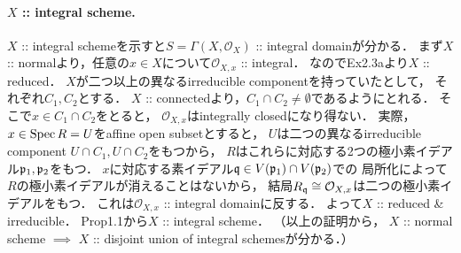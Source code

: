 \documentclass[a4paper]{jsarticle}
\newcommand{\shO}{\mathcal{O}}
\begin{document}
    \paragraph{$X$ :: integral scheme.}
    $X$ :: integral schemeを示すと$S=\Gamma(X,\shO_X)$ :: integral domainが分かる．
    まず$X$ :: normalより，任意の$x \in X$について$\shO_{X,x}$ :: integral．
    なのでEx2.3aより$X$ :: reduced．
    $X$が二つ以上の異なるirreducible componentを持っていたとして，
    それぞれ$C_1, C_2$とする．
    $X$ :: connectedより，$C_1 \cap C_2 \neq \emptyset$であるようにとれる．
    そこで$x \in C_1 \cap C_2$をとると，
    $\shO_{X,x}$はintegrally closedになり得ない．
    実際，
    $x \in \operatorname{Spec} R=U$をaffine open subsetとすると，
    $U$は二つの異なるirreducible component $U \cap C_1, U \cap C_2$をもつから，
    $R$はこれらに対応する2つの極小素イデアル$\mathfrak{p}_1, \mathfrak{p}_2$をもつ．
    $x$に対応する素イデアル$\mathfrak{q} \in V(\mathfrak{p}_1) \cap V(\mathfrak{p}_2)$での
    局所化によって$R$の極小素イデアルが消えることはないから，
    結局$R_{\I{q}} \iso \shO_{X,x}$は二つの極小素イデアルをもつ．
    これは$\shO_{X,x}$ :: integral domainに反する．
    よって$X$ :: reduced \& irreducible．
    Prop1.1から$X$ :: integral scheme．
    （以上の証明から，
    $X$ :: normal scheme $\implies$ $X$ :: disjoint union of integral schemesが分かる．）
\end{document}
